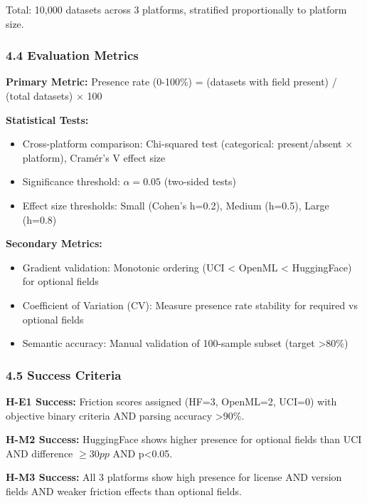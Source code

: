 Total: 10,000 datasets across 3 platforms, stratified proportionally to platform size.

\subsubsection{4.4 Evaluation Metrics}

\textbf{Primary Metric:} Presence rate (0-100\%) = (datasets with field present) / (total datasets) $\times$ 100

\textbf{Statistical Tests:}
\begin{itemize}
\item Cross-platform comparison: Chi-squared test (categorical: present/absent $\times$ platform), Cramér's V effect size
\item Significance threshold: $\alpha =0.05$ (two-sided tests)
\item Effect size thresholds: Small (Cohen's h=0.2), Medium (h=0.5), Large (h=0.8)
\end{itemize}

\textbf{Secondary Metrics:}
\begin{itemize}
\item Gradient validation: Monotonic ordering (UCI < OpenML < HuggingFace) for optional fields
\item Coefficient of Variation (CV): Measure presence rate stability for required vs optional fields
\item Semantic accuracy: Manual validation of 100-sample subset (target >80\%)
\end{itemize}

\subsubsection{4.5 Success Criteria}

\textbf{H-E1 Success:} Friction scores assigned (HF=3, OpenML=2, UCI=0) with objective binary criteria AND parsing accuracy >90\%.

\textbf{H-M2 Success:} HuggingFace shows higher presence for optional fields than UCI AND difference $\geq 30pp$ AND p<0.05.

\textbf{H-M3 Success:} All 3 platforms show high presence for license AND version fields AND weaker friction effects than optional fields.
